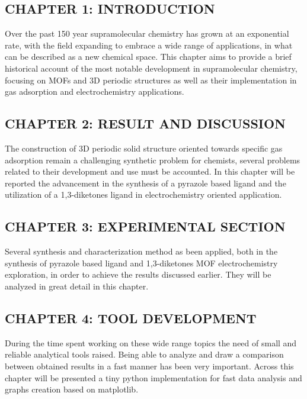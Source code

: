 \documentclass[a4,11pt,openright]{report}
\begin{document}
\subsection*{CHAPTER 1: INTRODUCTION}
Over the past 150 year supramolecular chemistry has grown at an exponential rate, with the field expanding to embrace a wide range of applications, in what can be described as a new chemical space. This chapter aims to provide a brief historical account of the most notable development in supramolecular chemistry, focusing on MOFs and 3D periodic structures as well as their implementation in gas adsorption and electrochemistry applications.
\newline\subsection*{CHAPTER 2: RESULT AND DISCUSSION}
The construction of 3D periodic solid structure oriented towards specific gas adsorption remain a challenging synthetic problem for chemists, several problems related to their development and use must be accounted. In this chapter will be reported the advancement in the synthesis of a pyrazole based ligand and the utilization of a 1,3-diketones ligand in electrochemistry oriented application.
\newline\subsection*{CHAPTER 3: EXPERIMENTAL SECTION}
Several synthesis and characterization method as been applied, both in the synthesis of pyrazole based ligand and 1,3-diketones MOF electrochemistry exploration, in order to achieve the results discussed earlier. They will be analyzed in great detail in this chapter.
\newline\subsection*{CHAPTER 4: TOOL DEVELOPMENT}
During the time spent working on these wide range topics the need of small and reliable analytical tools raised. Being able to analyze and draw a comparison between obtained results in a fast manner has been very important. Across this chapter will be presented a tiny python implementation for fast data analysis and graphs creation based on matplotlib.











\printbibliography
\end{document}
